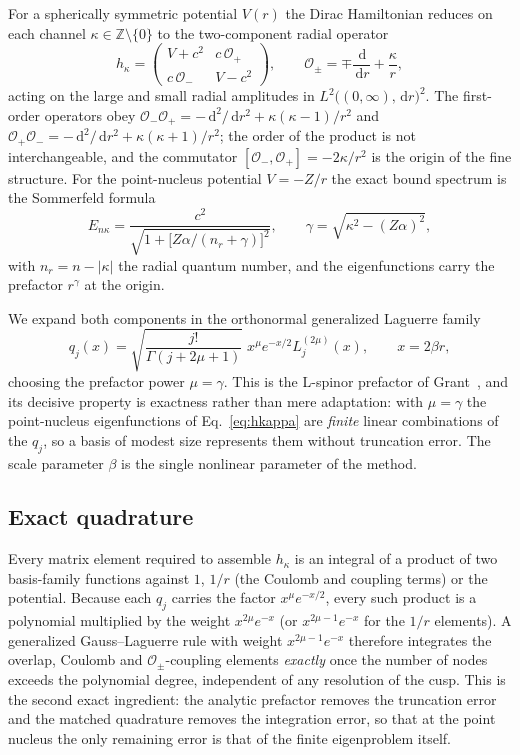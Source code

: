 \documentclass[aps,pra,twocolumn,superscriptaddress,showpacs,floatfix,longbibliography]{revtex4-2}
\newcommand{\Op}{\ensuremath{\mathcal{O}}}
\newcommand{\Za}{\ensuremath{Z\alpha}}
\newcommand{\rd}{\,\mathrm{d}}
\begin{document}
For a spherically symmetric potential $V(r)$ the Dirac Hamiltonian reduces
on each channel $\kappa\in\mathbb{Z}\setminus\{0\}$ to the two-component
radial operator
\begin{equation}
h_{\kappa}=
\begin{pmatrix}
V+c^{2} & c\,\Op_{+}\\[2pt]
c\,\Op_{-} & V-c^{2}
\end{pmatrix},
\qquad
\Op_{\pm}=\mp\frac{\rd}{\rd r}+\frac{\kappa}{r},
\label{eq:hkappa}
\end{equation}
acting on the large and small radial amplitudes in
$L^{2}\!\big((0,\infty),\rd r\big)^{2}$. The first-order operators obey
$\Op_{-}\Op_{+}=-\rd^{2}/\rd r^{2}+\kappa(\kappa-1)/r^{2}$ and
$\Op_{+}\Op_{-}=-\rd^{2}/\rd r^{2}+\kappa(\kappa+1)/r^{2}$; the order of
the product is not interchangeable, and the commutator
$[\Op_{-},\Op_{+}]=-2\kappa/r^{2}$ is the origin of the fine structure.
For the point-nucleus potential $V=-Z/r$ the exact bound spectrum is the
Sommerfeld formula
\begin{equation}
E_{n\kappa}=\frac{c^{2}}
{\sqrt{1+\big[\Za/(n_{r}+\gamma)\big]^{2}}},
\qquad \gamma=\sqrt{\kappa^{2}-(\Za)^{2}},
\label{eq:sommerfeld}
\end{equation}
with $n_{r}=n-|\kappa|$ the radial quantum number, and the eigenfunctions
carry the prefactor $r^{\gamma}$ at the origin.

We expand both components in the orthonormal generalized Laguerre family
\begin{equation}
q_{j}(x)=\sqrt{\frac{j!}{\Gamma(j+2\mu+1)}}\;
x^{\mu}e^{-x/2}L_{j}^{(2\mu)}(x),
\qquad x=2\beta r,
\label{eq:basis}
\end{equation}
choosing the prefactor power $\mu=\gamma$. This is the L-spinor prefactor
of Grant~\cite{Grant2007}, and its decisive property is exactness rather
than mere adaptation: with $\mu=\gamma$ the point-nucleus eigenfunctions
of Eq.~\eqref{eq:hkappa} are \emph{finite} linear combinations of the
$q_{j}$, so a basis of modest size represents them without truncation
error. The scale parameter $\beta$ is the single nonlinear parameter of
the method.

\subsection{Exact quadrature}

Every matrix element required to assemble $h_{\kappa}$ is an integral of a
product of two basis-family functions against $1$, $1/r$ (the Coulomb and
coupling terms) or the potential. Because each $q_{j}$ carries the factor
$x^{\mu}e^{-x/2}$, every such product is a polynomial multiplied by the
weight $x^{2\mu}e^{-x}$ (or $x^{2\mu-1}e^{-x}$ for the $1/r$ elements). A
generalized Gauss--Laguerre rule with weight $x^{2\mu-1}e^{-x}$ therefore
integrates the overlap, Coulomb and $\Op_{\pm}$-coupling elements
\emph{exactly} once the number of nodes exceeds the polynomial degree,
independent of any resolution of the cusp. This is the second exact
ingredient: the analytic prefactor removes the truncation error and the
matched quadrature removes the integration error, so that at the point
nucleus the only remaining error is that of the finite eigenproblem
itself.
\end{document}
